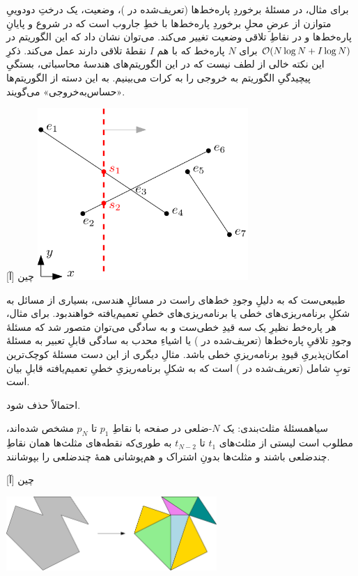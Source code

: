 برای مثال، در مسئلهٔ برخوردِ پاره‌خط‌ها (تعریف‌شده در )، وضعیت، یک درختِ دودوییِ متوازن از عرضِ محلِ برخوردِ پاره‌خط‌ها با خطِ جاروب است که در شروع و پایانِ پاره‌خط‌ها و در نقاطِ تلاقی وضعیت تغییر می‌کند. می‌توان نشان داد که این الگوریتم در 
$\mathcal{O}(N \log N + I \log N)$
برای $N$ پاره‌خط که با هم $I$ نقطهٔ تلاقی دارند عمل می‌کند. ذکرِ این نکته خالی از لطف نیست که در این الگوریتم‌های هندسهٔ محاسباتی، بستگیِ پیچیدگیِ الگوریتم به خروجی را به کرات می‌بینیم. به این دسته از الگوریتم‌ها «حساس‌به‌خروجی» می‌گویند. 

[آ]
‌چین
\includegraphics[width=0.6\textwidth]{figs/sweep-line.png}
 
طبیعی‌ست که به دلیلِ وجودِ خط‌های راست در مسائلِ هندسی، بسیاری از مسائل به شکلِ برنامه‌ریزی‌های خطی یا برنامه‌ریزی‌های خطیِ تعمیم‌یافته خواهندبود.
برای مثال، هر پاره‌خط نظیرِ یک سه قیدِ خطی‌ست و به سادگی می‌توان متصور شد که مسئلهٔ وجودِ تلاقیِ پاره‌خط‌ها  (تعریف‌شده در ) یا اشیاءِ محدب به سادگی قابلِ تعبیر به مسئلهٔ امکان‌پذیریِ قیودِ برنامه‌ریزیِ خطی باشد. مثالِ دیگری از این دست مسئلهٔ کوچک‌ترین توپِ شامل (تعریف‌شده در ) است که به شکلِ برنامه‌ریزیِ خطیِ تعمیم‌یافته قابلِ بیان است.

احتمالاً حذف شود.

‌سیاه{مسئلهٔ مثلث‌بندی}: یک $N$-ضلعی در صفحه با نقاطِ $p_1$ تا $p_N$ مشخص شده‌اند، مطلوب است لیستی از مثلث‌های $t_1$ تا $t_{N-2}$ به طوری‌که نقطه‌های مثلث‌ها همان نقاطِ چندضلعی باشند و مثلث‌ها بدونِ اشتراک و هم‌پوشانی همهٔ چندضلعی را بپوشانند. 

[آ]
‌چین

\includegraphics[width=0.6\textwidth]{figs/triangulation.png}

